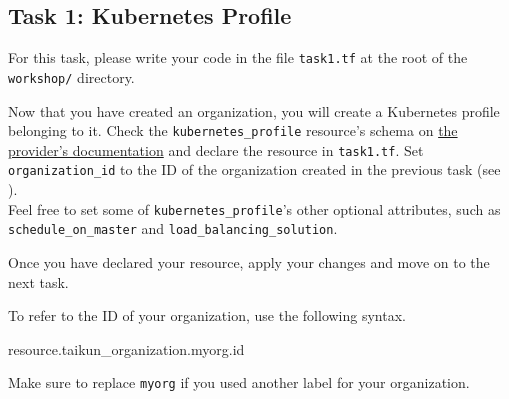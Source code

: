 \subsection{Task 1: Kubernetes Profile}\label{sec:task1}

\begin{note}
For this task, please write your code in the file \texttt{task1.tf}
at the root of the \texttt{workshop/} directory.
\end{note}

Now that you have created an organization,
you will create a Kubernetes profile belonging to it.
Check the \texttt{kubernetes\_profile} resource's schema on
\href{https://registry.terraform.io/providers/itera-io/taikun/latest/docs/resources/kubernetes_profile}{the provider's documentation}
and declare the resource in \texttt{task1.tf}.
Set \texttt{organization\_id} to the ID
of the organization created in the previous task (see ).\\

Feel free to set some of \texttt{kubernetes\_profile}'s other optional attributes,
such as \texttt{schedule\_on\_master} and \texttt{load\_balancing\_solution}.

Once you have declared your resource, apply your changes and move on to the next task.

\begin{tip}
To refer to the ID of your organization, use the following syntax.
\begin{tf}
resource.taikun_organization.myorg.id
\end{tf}
Make sure to replace \texttt{myorg} if you used another label for your organization.
\end{tip}

